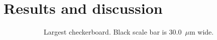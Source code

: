 \section*{Results and discussion}
\begin{figure}[!t]
    \centering
    \begin{subfigure}[t]{0.24\linewidth}
    	\centering
    	\caption{Largest checkerboard. Black scale bar is 30.0~$\mu$m wide.}
    	\label{fig:b2d5_q5}
    \end{subfigure}
    \hfill
    \begin{subfigure}[t]{0.24\linewidth}
    	\centering

\end{subfigure}
\end{figure}
